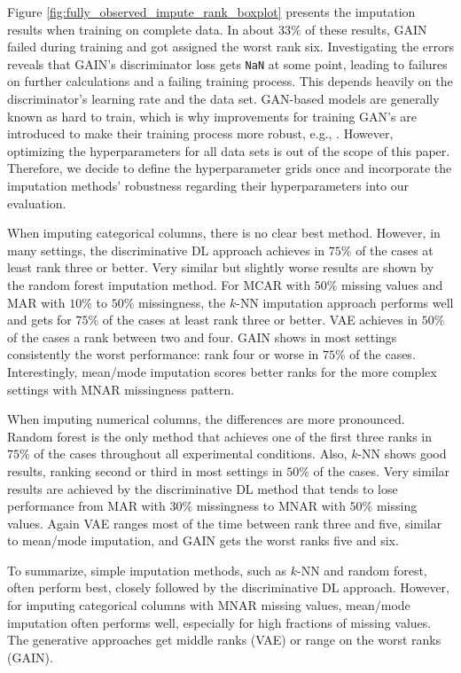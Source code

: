 \documentclass[utf8]{frontiersSCNS} %
\newcommand{\code}[1]{\texttt{#1}}
\begin{document}
Figure \ref{fig:fully_observed_impute_rank_boxplot} presents the imputation results when training on complete data. In about $33\%$ of these results, GAIN failed during training and got assigned the worst rank six. Investigating the errors reveals that GAIN's discriminator loss gets \code{NaN} at some point, leading to failures on further calculations and a failing training process. This depends heavily on the discriminator's learning rate and the data set. GAN-based models are generally known as hard to train, which is why improvements for training GAN's are introduced to make their training process more robust, e.g., \cite{GAN_balance_1, GAN_balance_2, GAN_balance_3}. However, optimizing the hyperparameters for all data sets is out of the scope of this paper. Therefore, we decide to define the hyperparameter grids once and incorporate the imputation methods' robustness regarding their hyperparameters into our evaluation.

When imputing categorical columns, there is no clear best method. However, in many settings, the discriminative DL approach achieves in $75\%$ of the cases at least rank three or better. Very similar but slightly worse results are shown by the random forest imputation method. For MCAR with $50\%$ missing values and MAR with $10\%$ to $50\%$ missingness, the $k$-NN imputation approach performs well and gets for $75\%$ of the cases at least rank three or better. VAE achieves in $50\%$ of the cases a rank between two and four. GAIN shows in most settings consistently the worst performance: rank four or worse in $75\%$ of the cases. Interestingly, mean/mode imputation scores better ranks for the more complex settings with MNAR missingness pattern.

When imputing numerical columns, the differences are more pronounced. Random forest is the only method that achieves one of the first three ranks in $75\%$ of the cases throughout all experimental conditions. Also, $k$-NN shows good results, ranking second or third in most settings in $50\%$ of the cases. Very similar results are achieved by the discriminative DL method that tends to lose performance from MAR with $30\%$ missingness to MNAR with $50\%$ missing values. Again VAE ranges most of the time between rank three and five, similar to mean/mode imputation, and GAIN gets the worst ranks five and six.

To summarize, simple imputation methods, such as $k$-NN and random forest, often perform best, closely followed by the discriminative DL approach. However, for imputing categorical columns with MNAR missing values, mean/mode imputation often performs well, especially for high fractions of missing values. The generative approaches get middle ranks (VAE) or range on the worst ranks (GAIN).
\end{document}
